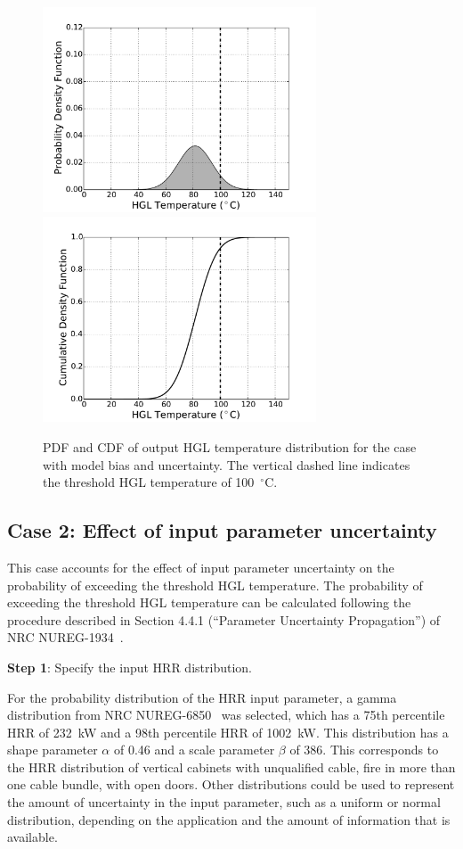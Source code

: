 \documentclass[12pt]{article}
\begin{document}
\begin{figure}[p]
\includegraphics[width=3.2in]{Figures/output_PDF_1_model}
\includegraphics[width=3.2in]{Figures/output_CDF_1_model}
\caption{PDF and CDF of output HGL temperature distribution for the case with model bias and uncertainty. The vertical dashed line indicates the threshold HGL temperature of 100~$^\circ$C.}
\label{fig:case_1_output_distributions}
\end{figure}

\clearpage


\subsection{Case 2: Effect of input parameter uncertainty}

This case accounts for the effect of input parameter uncertainty on the probability of exceeding the threshold HGL temperature. The probability of exceeding the threshold HGL temperature can be calculated following the procedure described in Section 4.4.1 (``Parameter Uncertainty Propagation'') of NRC NUREG-1934~\cite{NUREG_1934}.

\textbf{Step 1}: Specify the input HRR distribution.

For the probability distribution of the HRR input parameter, a gamma distribution from NRC NUREG-6850~\cite{NUREG_6850} was selected, which has a 75th percentile HRR of 232~kW and a 98th percentile HRR of 1002~kW. This distribution has a shape parameter $\alpha$ of 0.46 and a scale parameter $\beta$ of 386. This corresponds to the HRR distribution of vertical cabinets with unqualified cable, fire in more than one cable bundle, with open doors. Other distributions could be used to represent the amount of uncertainty in the input parameter, such as a uniform or normal distribution, depending on the application and the amount of information that is available.
\end{document}
